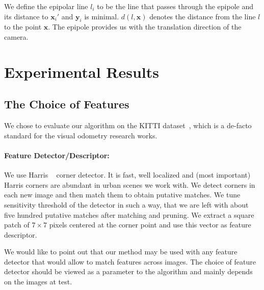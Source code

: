 \documentclass{bmvc2k}
\begin{document}
We define the epipolar line $l_i$ to be the line that passes through
the epipole and its distance to $\mathbf{x}_i'$ and $\mathbf{y}_i$ is
minimal. $d(l,\mathbf{x})$ denotes the distance from the line $l$ to
the point $\mathbf{x}$.  The epipole provides us with the translation
direction of the camera.

\section{Experimental Results}\label{sec:results}

\subsection{The Choice of Features}
We chose to evaluate our algorithm on the KITTI
dataset~\cite{Geiger2012}, which is a de-facto standard for the
visual odometry research works.

\paragraph{Feature Detector/Descriptor:} We use Harris
~\cite{Harris1988} corner detector. It is fast, well localized and
(most important) Harris corners are abundant in urban scenes we work
with. We detect corners in each new image and then match them to
obtain putative matches.  We tune sensitivity threshold of the
detector in such a way, that we are left with about five hundred
putative matches after matching and pruning.  We extract a square
patch of $7\times 7$ pixels centered at the corner point and use this
vector as feature descriptor.

We would like to point out that our method may be used with any
feature detector that would allow to match features across images. The
choice of feature detector should be viewed as a parameter to the
algorithm and mainly depends on the images at test.
\end{document}
